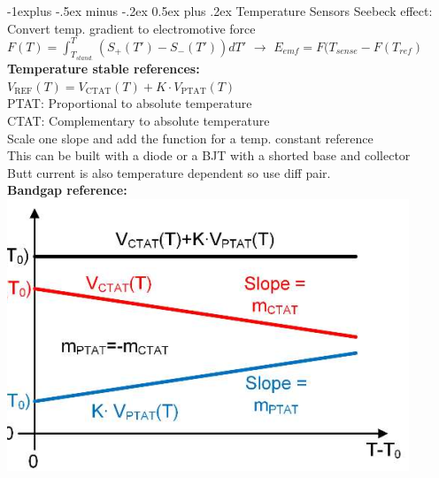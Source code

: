 \documentclass[5pt]{article}
\makeatletter
\renewcommand{\subsection}{\@startsection{subsection}{2}{0mm}%
                                {-1explus -.5ex minus -.2ex}%
                                {0.5ex plus .2ex}%
                                {\normalfont\normalsize\bfseries}}
\makeatother
\begin{document}
\begin{multicols*}{4}
\subsection{Temperature Sensors}
Seebeck effect: Convert temp. gradient to electromotive force
$ F(T)  \hat{=} \int_{T_{stand.}}^{T} (S_{+} (T') - S_- (T')) dT'   $ $ \rightarrow $ $ E_{emf} = F(T_{sense} - F(T_{ref})$
\textbf{Temperature stable references:}\\
$ V_{\mathrm{REF}}(T)=V_{\mathrm{CTAT}}(T)+K \cdot V_{\mathrm{PTAT}}(T) $\\
PTAT: Proportional to absolute temperature\\
CTAT: Complementary to absolute temperature\\
Scale one slope and add the function for a temp. constant reference\\
This can be built with a diode or a BJT with a shorted base and collector\\
Butt current is also temperature dependent so use diff pair.\\
\textbf{Bandgap reference:}
\includegraphics[width=0.8\columnwidth]{images/bandgapreference.png}


\end{multicols*}
\end{document}
